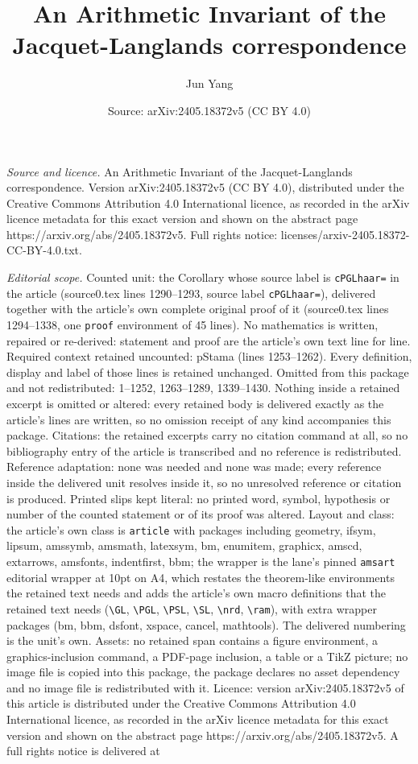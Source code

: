 \documentclass[10pt,a4paper]{amsart}
\title[An Arithmetic Invariant of the Jacquet-Langlands corresponde]{An Arithmetic Invariant of the Jacquet-Langlands correspondence}
\author{Jun Yang}
\date{Source: arXiv:2405.18372v5 (CC BY 4.0)}
\begin{document}
\maketitle

\noindent\emph{Source and licence.} An Arithmetic Invariant of the Jacquet-Langlands correspondence. Version arXiv:2405.18372v5 (CC BY 4.0), distributed under the Creative Commons Attribution 4.0 International licence, as recorded in the arXiv licence metadata for this exact version and shown on the abstract page https://arxiv.org/abs/2405.18372v5. Full rights notice: licenses/arxiv-2405.18372-CC-BY-4.0.txt.\par\smallskip

\noindent\textit{Editorial scope.} Counted unit: the Corollary whose source label is \texttt{cPGLhaar=} in the article (source0.tex lines 1290--1293, source label \texttt{cPGLhaar=}), delivered together with the article's own complete original proof of it (source0.tex lines 1294--1338, one \texttt{proof} environment of 45 lines). No mathematics is written, repaired or re-derived: statement and proof are the article's own text line for line. Required context retained uncounted: pStama (lines 1253--1262). Every definition, display and label of those lines is retained unchanged. Omitted from this package and not redistributed: 1--1252, 1263--1289, 1339--1430. Nothing inside a retained excerpt is omitted or altered: every retained body is delivered exactly as the article's lines are written, so no omission receipt of any kind accompanies this package. Citations: the retained excerpts carry no citation command at all, so no bibliography entry of the article is transcribed and no reference is redistributed. Reference adaptation: none was needed and none was made; every reference inside the delivered unit resolves inside it, so no unresolved reference or citation is produced. Printed slips kept literal: no printed word, symbol, hypothesis or number of the counted statement or of its proof was altered. Layout and class: the article's own class is \texttt{article} with packages including geometry, ifsym, lipsum, amssymb, amsmath, latexsym, bm, enumitem, graphicx, amscd, extarrows, amsfonts, indentfirst, bbm; the wrapper is the lane's pinned \texttt{amsart} editorial wrapper at 10pt on A4, which restates the theorem-like environments the retained text needs and adds the article's own macro definitions that the retained text needs (\texttt{\textbackslash GL}, \texttt{\textbackslash PGL}, \texttt{\textbackslash PSL}, \texttt{\textbackslash SL}, \texttt{\textbackslash nrd}, \texttt{\textbackslash ram}), with extra wrapper packages (bm, bbm, dsfont, xspace, cancel, mathtools). The delivered numbering is the unit's own. Assets: no retained span contains a figure environment, a graphics-inclusion command, a PDF-page inclusion, a table or a TikZ picture; no image file is copied into this package, the package declares no asset dependency and no image file is redistributed with it. Licence: version arXiv:2405.18372v5 of this article is distributed under the Creative Commons Attribution 4.0 International licence, as recorded in the arXiv licence metadata for this exact version and shown on the abstract page https://arxiv.org/abs/2405.18372v5. A full rights notice is delivered at 
\end{document}
